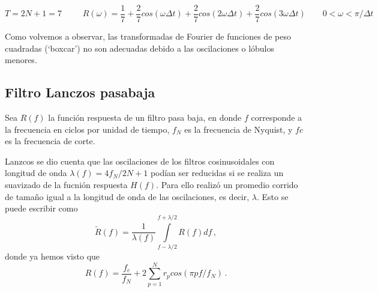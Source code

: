 \documentclass[
]{agujournal2019}
\begin{document}
\[T=2N+1=7\,\,\,\,\,\,\,\,\,\,\,\,\,\,\,
R(\omega)=\frac{1}{7} + \frac{2}{7}cos(\omega \Delta t)+ \frac{2}{7}cos(2\omega \Delta t)+ \frac{2}{7}cos(3\omega \Delta t)
\,\,\,\,\,\,\,\,\,\,\,\,0<\omega<\pi/\Delta t\]

\begin{center}
\end{center}

Como volvemos a observar, las transformadas de Fourier de funciones de
peso cuadradas (`boxcar') no son adecuadas debido a las oscilaciones o
lóbulos menores.

\subsection{Filtro Lanczos pasabaja}

Sea \(R(f)\) la función respuesta de un filtro pasa baja, en donde \(f\)
corresponde a la frecuencia en ciclos por unidad de tiempo, \(f_N\) es
la frecuencia de Nyquist, y \(fc\) es la frecuencia de corte.

\begin{center}
\end{center}

Lanzcos se dio cuenta que las oscilaciones de los filtros cosinusoidales
con longitud de onda \(\lambda(f)=4f_N/2N+1\) podían ser reducidas si se
realiza un suavizado de la fucnión respuesta \(H(f)\). Para ello realizó
un promedio corrido de tamaño igual a la longitud de onda de las
oscilaciones, es decir, \(\lambda\). Esto se puede escribir como
\[\widetilde{R}(f)=\frac{1}{\lambda(f)}\int\limits^{f+\lambda/2}_{f-\lambda/2} R(f) d{f}\,,\]
donde ya hemos visto que \[R(f)=\frac{f_c}{f_N} + 2\sum\limits^{N}_{p=1}
r_p cos(\pi p f / f_N)\,.\]
\end{document}
